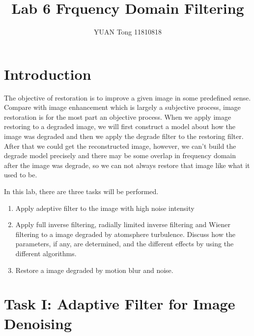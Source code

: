 \documentclass[
	12pt, %
]{style/fphw}
\title{Lab 6 Frquency Domain Filtering} %
\author{YUAN Tong 11810818} %
\institute{Southern University of Science and Technology \\ School of Microelectronic} %
\begin{document}
\maketitle %


\section*{Introduction}
The objective of restoration is to improve a given image in some predefined sense. Compare with image enhancement which is largely a subjective process, image restoration is for the most part an objective process. When we apply image restoring to a degraded image, we will first construct a model about how the image was degraded and then we apply the degrade filter to the restoring filter. After that we could get the reconstructed image, however, we can't build the degrade model precisely and there may be some overlap in frequency domain after the image was degrade, so we can not always restore that image like what it used to be.

In this lab, there are three tasks will be performed.

\begin{enumerate}
	\item Apply adeptive filter to the image with high noise intensity
	\item Apply full inverse filtering, radially limited inverse filtering and Wiener filtering to a image degraded by atomsphere turbulence. Discuss how the parameters, if any, are determined, and the different effects by using the different algorithms.
	\item Restore a image degraded by motion blur and noise.
\end{enumerate}


\newpage
\section*{Task I: Adaptive Filter for Image Denoising}
\end{document}
